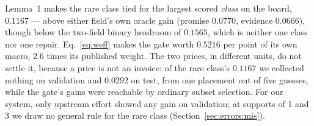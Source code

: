  Lemma~1 makes the rare class tied for the largest
scored \emph{class} on the board, $0.1167$ --- above either field's own oracle gain (promise
$0.0770$, evidence $0.0666$), though below the two-field binary headroom of $0.1565$, which is
neither one class nor one repair. Eq.~\eqref{eq:weff} makes the gate worth $0.5216$ per point of
its own macro, $2.6$ times its published weight. The
two prices, in different units, do not settle it, because a price is not an invoice: of the rare
class's $0.1167$ we
collected nothing on validation and $0.0292$ on test, from one placement out of five guesses,
while the gate's gains were reachable by ordinary subset selection. For our system, only upstream
effort showed any gain on validation; at supports of 1 and 3 we draw no general rule for
the rare class (Section~\ref{sec:errors:mis}).
